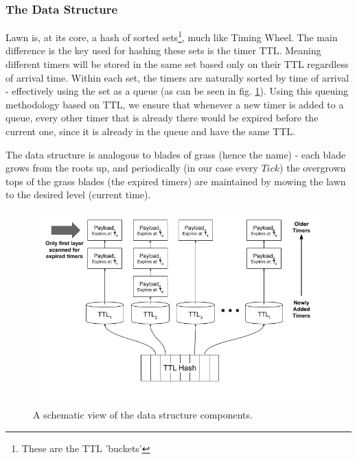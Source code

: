 \documentclass[conference]{IEEEtran}
\begin{document}
\subsubsection{The Data Structure}
Lawn is, at its core, a hash of sorted sets\footnote{These are the TTL 'buckets'}, much like Timing Wheel. The main difference is the key used for hashing these sets is the timer TTL. Meaning different timers will be stored in the same set based only on their TTL regardless of arrival time. Within each set, the timers are naturally sorted by time of arrival - effectively using the set as a queue  (as can be seen in fig. \ref{fig:Lawn1}). Using this queuing methodology based on TTL, we ensure that whenever a new timer is added to a queue, every other timer that is already there would be expired before the current one, since it is already in the queue and have the same TTL.

The data structure is analogous to blades of grass (hence the name) - each blade grows from the roots up, and periodically (in our case every $Tick$) the overgrown tops of the grass blades (the expired timers) are maintained by mowing the lawn to the desired level (current time).

\begin{figure}
	\centering
	\includegraphics[width=0.9\linewidth]{lawn.png}
	\caption[Lawn schematic diagram]{A schematic view of the data structure components.}
	\label{fig:Lawn1}
\end{figure}
\end{document}
